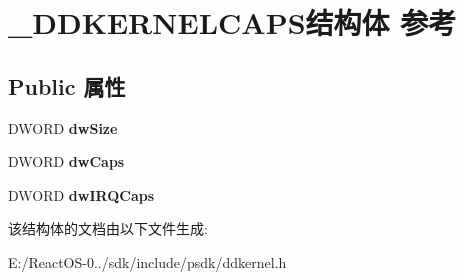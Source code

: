 \hypertarget{struct___d_d_k_e_r_n_e_l_c_a_p_s}{}\section{\+\_\+\+D\+D\+K\+E\+R\+N\+E\+L\+C\+A\+P\+S结构体 参考}
\label{struct___d_d_k_e_r_n_e_l_c_a_p_s}
\subsection*{Public 属性}
\begin{DoxyCompactItemize}
\item 
\mbox{\label{struct___d_d_k_e_r_n_e_l_c_a_p_s_ad2be4b80e8d782d0eb6214e2a6cd3c7b}} 
D\+W\+O\+RD {\bfseries dw\+Size}
\item 
\mbox{\label{struct___d_d_k_e_r_n_e_l_c_a_p_s_a52444801372a0fa992606014cdf84792}} 
D\+W\+O\+RD {\bfseries dw\+Caps}
\item 
\mbox{\label{struct___d_d_k_e_r_n_e_l_c_a_p_s_a712e4f2cd3a12b19e1d357b91d3bb94d}} 
D\+W\+O\+RD {\bfseries dw\+I\+R\+Q\+Caps}
\end{DoxyCompactItemize}


该结构体的文档由以下文件生成\+:\begin{DoxyCompactItemize}
\item 
E\+:/\+React\+O\+S-\/0../sdk/include/psdk/ddkernel.\+h\end{DoxyCompactItemize}
